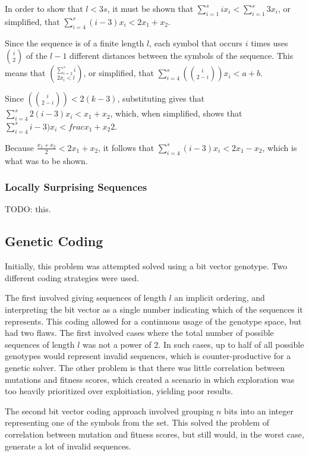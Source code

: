 \documentclass{article}
\begin{document}
In order to show that $ l < 3s $, it must be shown that $ \sum_{i=1}^{s} i x_i < \sum_{i=1}^{s} 3 x_i $, or simplified, that $ \sum_{i=4}^{s} (i - 3) x_i < 2x_1 + x_2 $.

Since the sequence is of a finite length $ l $, each symbol that occurs $ i $ times uses  $ i \choose 2 $ of the $ l - 1 $ different distances between the symbols of the sequence.
This means that $ \sum_{i=2}^{s} i \choose 2 x_i < l $, or simplified, that $ \sum_{i=4}^{s} (i \choose 2 - i) x_i < a + b $.

Since $ (i \choose 2 - i) < 2(k - 3) $, substituting gives that $ \sum_{i=4}^{s} 2(i - 3) x_i < x_1 + x_2 $, which, when simplified, shows that $ \sum_{i=4}^{s} i - 3) x_i < frac{x_1 + x_2}{2} $.

Because $ \frac{x_1 + x_2}{2} < 2x_1 + x_2 $, it follows that $ \sum_{i=4}^{s} (i - 3) x_i < 2x_1 - x_2 $, which is what was to be shown.

\subsubsection{Locally Surprising Sequences}

TODO: this.

\subsection{Genetic Coding}

Initially, this problem was attempted solved using a bit vector genotype.
Two different coding strategies were used.

The first involved giving sequences of length $ l $ an implicit ordering, and interpreting the bit vector as a single number indicating which of the sequences it represents.
This coding allowed for a continuous usage of the genotype space, but had two flaws.
The first involved cases where the total number of possible sequences of length $ l $ was not a power of 2.
In such cases, up to half of all possible genotypes would represent invalid sequences, which is counter-productive for a genetic solver.
The other problem is that there was little correlation between mutations and fitness scores, which created a scenario in which exploration was too heavily prioritized over exploitiation, yielding poor results.

The second bit vector coding approach involved grouping $ n $ bits into an integer representing one of the symbols from the set.
This solved the problem of correlation between mutation and fitness scores, but still would, in the worst case, generate a lot of invalid sequences.
\end{document}
